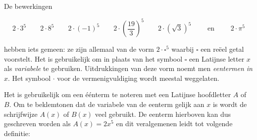 \documentclass{ximera}
\begin{document}
	\author{Koen de Naeghel - Wiskunde Op Maat}
    \xmsource

	


De bewerkingen

\[
2\cdot 3^5
\qquad 2\cdot 8^5
\qquad 2\cdot (-1)^5
\qquad 2\cdot\left(\frac{19}{3}\right)^5
\qquad 2\cdot\left(\sqrt{3}\right)^5 
\qquad \text{ en } \qquad 2 \cdot \pi^5
\]


hebben iets gemeen: ze zijn allemaal van de vorm $2\cdot \square^5$ waarbij $\square$ een reëel getal voorstelt. Het is gebruikelijk om in plaats van het symbool $\square$ een Latijnse letter $x$ als \textit{ variabele} te gebruiken. Uitdrukkingen van deze vorm noemt men \textit{ eentermen in $x$}. Het symbool $\cdot$ voor de vermenigvuldiging wordt meestal weggelaten. 

Het is gebruikelijk om een éénterm te noteren met een Latijnse hoofdletter $A$ of $B$. Om te beklemtonen dat de variabele van de eenterm gelijk aan $x$  is wordt de schrijfwijze $A(x)$ of $B(x)$ veel gebruikt. De eenterm hierboven kan dus geschreven worden als $A(x) = 2x^5$ en dit veralgemenen leidt tot volgende definitie:

\end{document}
